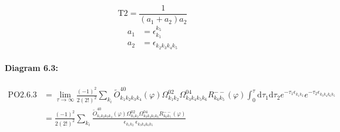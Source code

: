 \documentclass[10pt,a4paper]{article}
\begin{document}
\begin{equation}
\text{T}2 = \frac{1}{(a_1+ a_2)a_2}\end{equation}
\begin{align*}
a_1 &= \epsilon^{k_{5}}_{k_{1}}\\
a_2 &= \epsilon^{}_{k_{2}k_{3}k_{4}k_{5}}
\end{align*}
\paragraph{Diagram 6.3:}
\begin{align}
\text{PO}2.6.3
&= \lim\limits_{\tau \to \infty}\frac{(-1)^2 }{2(2!)^2}\sum_{k_i}\tilde{O}^{40}_{k_{1}k_{2}k_{3}k_{4}} (\varphi) \Omega^{02}_{k_{1}k_{2}} \Omega^{04}_{k_{3}k_{4}k_{5}k_{6}} R^{--}_{k_{6}k_{5}}(\varphi)\int_{0}^{\tau}\mathrm{d}\tau_1\mathrm{d}\tau_2e^{-\tau_1 \epsilon^{}_{k_{1}k_{2}}}e^{-\tau_2 \epsilon^{}_{k_{3}k_{4}k_{6}k_{5}}}
 \nonumber \\
&= \frac{(-1)^2 }{2(2!)^2}\sum_{k_i}\frac{\tilde{O}^{40}_{k_{1}k_{2}k_{3}k_{4}} (\varphi) \Omega^{02}_{k_{1}k_{2}} \Omega^{04}_{k_{3}k_{4}k_{5}k_{6}} R^{--}_{k_{6}k_{5}}(\varphi)}{\epsilon^{}_{k_{1}k_{2}}\ \epsilon^{}_{k_{3}k_{4}k_{6}k_{5}}\ } 
\end{align}
\end{document}
